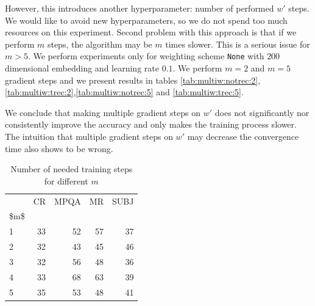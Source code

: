     However, this introduces another hyperparameter: number of performed $w'$ steps.
    We would like to avoid new hyperparameters, so we do not spend too much resources on this experiment.
    Second problem with this approach is that if we perform $m$ steps, the algorithm may be $m$ times slower. 
    This is a serious issue for $m>5$. 
    We perform experiments only for weighting scheme \texttt{None} with $200$ dimensional embedding and learning rate $0.1$.
    We perform $m=2$ and $m=5$ gradient steps and we present results in tables \ref{tab:multiw:notrec:2},
    \ref{tab:multiw:trec:2},\ref{tab:multiw:notrec:5} and \ref{tab:multiw:trec:5}.
    
    

    We conclude that making multiple gradient steps on $w'$ does not significantly nor consistently improve the accuracy and only makes the training process slower.
    The intuition that multiple gradient steps on $w'$ may decrease the convergence time also shows to be wrong.


\begin{table}[H]
\begin{center}

\begin{tabular}{lrrrr}
\toprule
{} & CR & MPQA & MR & SUBJ \\
\$m\$ &      &       &      &       \\
\midrule
1  &     33 &      52 &     57 &      37 \\
2  &     32 &      43 &     45 &      46 \\
3  &     32 &      56 &     48 &      36 \\
4  &     33 &      68 &     63 &      39 \\
5  &     35 &      53 &     48 &      41 \\
\bottomrule
\end{tabular}

\caption[Number of needed training steps for different $m$]{Number of needed training steps for different $m$}
\label{tab:multyw:steps}
\end{center}
\end{table}


